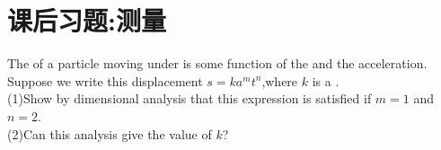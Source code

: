 \section{课后习题:测量}

\begin{example}
    The  of a particle moving under  is some function of the  and
    the acceleration. Suppose we write this displacement
    $s=ka^mt^n$,where $k$ is a . \\
    (1)Show by
    dimensional analysis that this expression is satisfied if
    $m = 1$ and $n = 2$. \\
    (2)Can this analysis give the value of $k$?
\end{example}



